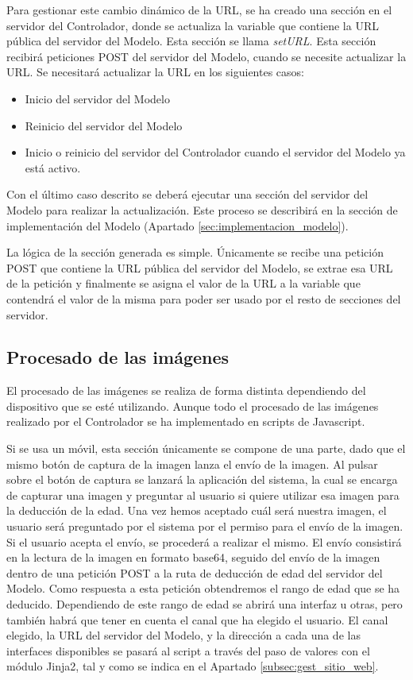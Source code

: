 Para gestionar este cambio dinámico de la URL, se ha creado una sección en el servidor del Controlador, donde se actualiza la variable que contiene la URL pública del servidor del Modelo. Esta sección se llama \textit{setURL}. Esta sección recibirá peticiones POST del servidor del Modelo, cuando se necesite actualizar la URL. Se necesitará actualizar la URL en los siguientes casos:

\begin{itemize}
\item Inicio del servidor del Modelo
\item Reinicio del servidor del Modelo
\item Inicio o reinicio del servidor del Controlador cuando el servidor del Modelo ya está activo.
\end{itemize}

Con el último caso descrito se deberá ejecutar una sección del servidor del Modelo para realizar la actualización. Este proceso se describirá en la sección de implementación del Modelo (Apartado \ref{sec:implementacion_modelo}).

La lógica de la sección generada es simple. Únicamente se recibe una petición POST que contiene la URL pública del servidor del Modelo, se extrae esa URL de la petición y finalmente se asigna el valor de la URL a la variable que contendrá el valor de la misma para poder ser usado por el resto de secciones del servidor.


\subsection{Procesado de las imágenes}

El procesado de las imágenes se realiza de forma distinta dependiendo del dispositivo que se esté utilizando. Aunque todo el procesado de las imágenes realizado por el Controlador se ha implementado en scripts de Javascript.

Si se usa un móvil, esta sección únicamente se compone de una parte, dado que el mismo botón de captura de la imagen lanza el envío de la imagen. Al pulsar sobre el botón de captura se lanzará la aplicación del sistema, la cual se encarga de capturar una imagen y preguntar al usuario si quiere utilizar esa imagen para la deducción de la edad. Una vez hemos aceptado cuál será nuestra imagen, el usuario será preguntado por el sistema por el permiso para el envío de la imagen. Si el usuario acepta el envío, se procederá a realizar el mismo. El envío consistirá en la lectura de la imagen en formato base64, seguido del envío de la imagen dentro de una petición POST a la ruta de deducción de edad del servidor del Modelo. Como respuesta a esta petición obtendremos el rango de edad que se ha deducido. Dependiendo de este rango de edad se abrirá una interfaz u otras, pero también habrá que tener en cuenta el canal que ha elegido el usuario. El canal elegido, la URL del servidor del Modelo, y la dirección a cada una de las interfaces disponibles se pasará al script a través del paso de valores con el módulo Jinja2, tal y como se indica en el Apartado \ref{subsec:gest_sitio_web}.

